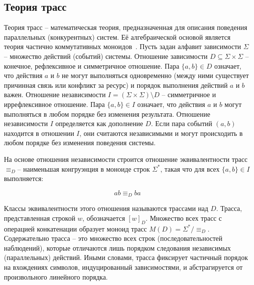 \subsection{Теория трасс}
\label{sec:trace-theory}

Теория трасс -- математическая теория, предназначенная для описания
поведения параллельных (конкурентных) систем. Её алгебраической
основой является теория частично коммутативных
моноидов~\cite{mazurkiewicz1986trace,mazurkiewicz1995introduction}.
Пусть задан алфавит зависимости $\Sigma$ -- множество действий
(событий) системы.
Отношение зависимости $D \subseteq \Sigma \times \Sigma$ -- конечное,
рефлексивное и симметричное отношение.
Пара $\{a, b\} \in D$ означает, что действия $a$ и $b$ не могут
выполняться одновременно (между ними существует причинная связь или
конфликт за ресурс) и порядок выполнения действий $a$ и $b$ важен.
Отношение независимости $I = (\Sigma \times \Sigma) \setminus D$ --
симметричное и иррефлексивное отношение.
Пара $\{a, b\} \in I$ означает, что действия $a$ и $b$ могут
выполняться в любом порядке без изменения результата.
Отношение независимости $I$ определяется как дополнение $D$.
Если пара событий $(a, b)$ находится в отношении $I$, они считаются
независимыми и могут происходить в любом порядке без изменения
поведения системы.

На основе отношения независимости строится отношение эквивалентности
трасс $\equiv_D$​ -- наименьшая конгруэнция в моноиде строк
$\Sigma^*$, такая что для всех
$\{a, b\} \in I$ выполняется:

\begin{equation}
  ab \equiv_D ba
\end{equation}

Классы эквивалентности этого отношения называются трассами над $D$.
Трасса, представленная строкой $w$, обозначается $[w]_D$​.
Множество всех трасс с операцией конкатенации образует моноид трасс
$M(D)=\Sigma^* /\equiv_D$​.
Содержательно трасса -- это множество всех строк (последовательностей
наблюдений), которые отличаются лишь порядком следования независимых
(параллельных) действий.
Иными словами, трасса фиксирует частичный порядок на вхождениях
символов, индуцированный зависимостями, и абстрагируется от
произвольного линейного порядка.

